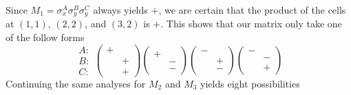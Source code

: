 \documentclass{article}
\begin{document}
Since $M_1 = \sigma^A_x \sigma^B_y \sigma^C_y$ always yields $+$,
we are certain that the product of the cells at $(1, 1)$, $(2, 2)$, and $(3, 2)$ is $+$.
This shows that our matrix only take one of the follow forms
$$
\begin{array}{ccc}
A: \\
B: \\
C:
\end{array}
\left(\begin{array}{ccc}
+ &   \\
  & + \\
  & +
\end{array}\right)
\left(\begin{array}{ccc}
+ &   \\
  & - \\
  & -
\end{array}\right)
\left(\begin{array}{ccc}
- &   \\
  & + \\
  & -
\end{array}\right)
\left(\begin{array}{ccc}
- &   \\
  & - \\
  & +
\end{array}\right)
$$
Continuing the same analyses for $M_2$ and $M_3$ yields eight possibilities
\end{document}
